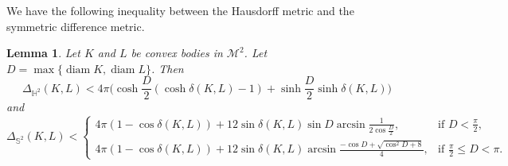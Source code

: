 \documentclass[12pt,reqno]{amsart}
\newtheorem{lemma}[theorem]{Lemma}
\theoremstyle{remark}
\newcommand{\hyp}{{\mathbb H}}
\newcommand{\sph}{{\mathbb S}}
\newcommand{\M}{\mathcal{M}}
\DeclareMathOperator{\diam}{\mathrm{diam}}
\begin{document}
We have the following inequality between the Hausdorff metric and the symmetric difference metric.

\begin{lemma}\label{lem:noneuclidean-groemer}
Let $K$ and $L$ be convex bodies in $\M^2$. Let $D=\max\{\diam K,\diam L\}$. Then
\begin{equation}
\Delta_{\hyp^2}(K,L)<
    4\pi\Big(\cosh\frac{D}{2}(\cosh\delta(K,L)-1)+\sinh\frac{D}{2}\sinh\delta(K,L)\Big)
\end{equation}
and
\begin{equation}
\Delta_{\sph^2}(K,L)<\begin{cases}
    4\pi(1-\cos\delta(K,L))+12\sin\delta(K,L)\sin D \arcsin\frac{1}{2\cos\frac{D}{2}}, &\text{if }D<\frac{\pi}{2},\\
    4\pi(1-\cos\delta(K,L))+12\sin\delta(K,L)\arcsin\frac{-\cos D+\sqrt{\cos^2 D+8}}{4}, &\text{if }\frac{\pi}{2}\leq D<\pi.
\end{cases}
\end{equation}
\end{lemma}
\end{document}
